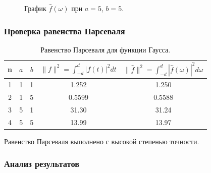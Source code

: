 \documentclass[a5paper, 10pt]{article}
\theoremstyle{definition}
\theoremstyle{plain}
\theoremstyle{remark}
\begin{document}
\begin{figure}[h!]
\caption{График $\hat{f}(\omega)$ при $a = 5$, $b = 5$.}
\end{figure}





\subsubsection{Проверка равенства Парсеваля}

\begin{table}[h!]
\caption{Равенство Парсеваля для функции Гаусса.}
\label{tabular:timesandtenses}
\begin{center}
\begin{tabular}{|c|c|c|c|c|}
\hline
n & $a$ & $b$ & $\| f \|^2 = \int_{-d}^d |f(t)|^2 dt $ & $\| \hat{f} \|^2 = \int_{-d}^d |\hat{f}(\omega)|^2 d\omega $ \\
\hline
1 & 1 & 1 &  1.252& 1.250\\
\hline
2 & 1 & 5 & 0.5599 & 0.5588 \\
\hline
3 & 5 & 1 & 31.30  & 31.24 \\
\hline
4 & 5 & 5 & 13.99  & 13.97\\
\hline
\end{tabular}
\end{center}
\end{table}

Равенство Парсеваля выполнено с высокой степенью точности.


\newpage
\subsubsection{Анализ результатов}
\end{document}
